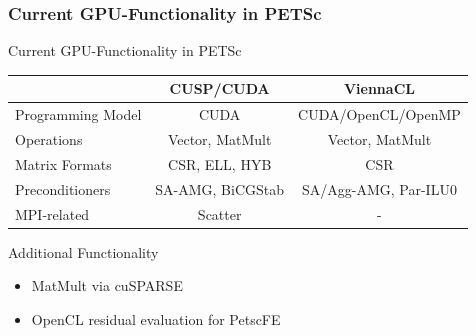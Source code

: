 \begin{frame}[fragile]
\frametitle{Current GPU-Functionality in PETSc}
  
  \begin{block}{Current GPU-Functionality in PETSc}
  \begin{center}
  \renewcommand{\arraystretch}{1.2}
  \begin{tabular}{|l|c|c|}
   \hline
                     & \textbf{CUSP/CUDA}  & \textbf{ViennaCL} \\
   \hline
   Programming Model & CUDA                & CUDA/OpenCL/OpenMP \\
   \hline
   Operations        & Vector, MatMult     & Vector, MatMult \\
   \hline
   Matrix Formats    & CSR, ELL, HYB       & CSR \\
   \hline
   Preconditioners   & SA-AMG, BiCGStab    & SA/Agg-AMG, Par-ILU0 \\
   \hline
   MPI-related       & Scatter             & - \\
   \hline
  \end{tabular}
  \end{center}
  \end{block}

  \begin{block}{Additional Functionality}
   \begin{itemize}
    \item MatMult via cuSPARSE
    \item OpenCL residual evaluation for PetscFE
   \end{itemize}
  \end{block}


\end{frame}


